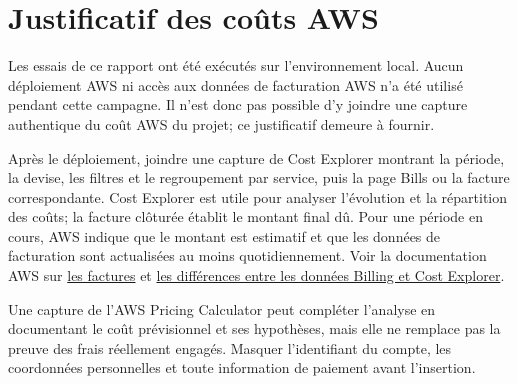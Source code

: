 \documentclass[11pt,a4paper,oneside]{report}
\begin{document}
\chapter{Justificatif des coûts AWS}
Les essais de ce rapport ont été exécutés sur l’environnement local. Aucun déploiement AWS ni accès aux données de facturation AWS n’a été utilisé pendant cette campagne. Il n’est donc pas possible d’y joindre une capture authentique du coût AWS du projet; ce justificatif demeure à fournir.

Après le déploiement, joindre une capture de Cost Explorer montrant la période, la devise, les filtres et le regroupement par service, puis la page Bills ou la facture correspondante. Cost Explorer est utile pour analyser l’évolution et la répartition des coûts; la facture clôturée établit le montant final dû. Pour une période en cours, AWS indique que le montant est estimatif et que les données de facturation sont actualisées au moins quotidiennement. Voir la documentation AWS sur \href{https://docs.aws.amazon.com/awsaccountbilling/latest/aboutv2/getting-viewing-bill.html}{les factures} et \href{https://docs.aws.amazon.com/us_en/awsaccountbilling/latest/aboutv2/differences-billing-data-cost-explorer-data.html}{les différences entre les données Billing et Cost Explorer}.

Une capture de l’AWS Pricing Calculator peut compléter l’analyse en documentant le coût prévisionnel et ses hypothèses, mais elle ne remplace pas la preuve des frais réellement engagés. Masquer l’identifiant du compte, les coordonnées personnelles et toute information de paiement avant l’insertion.
\end{document}
